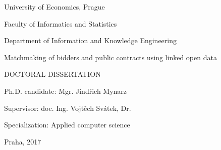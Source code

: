 \begin{titlepage}
    \begin{center}
        \begingroup 
        \sffamily

        \large
        University of Economics, Prague
        
        \small
        Faculty of Informatics and Statistics
        
        Department of Information and Knowledge Engineering

        \vfill

        \LARGE
        Matchmaking of bidders and public contracts using linked open data
        
        \normalsize
        \uppercase{Doctoral dissertation}

        \vspace{4cm}
       
        \small
        Ph.D. candidate: Mgr. Jindřich Mynarz

        Supervisor: doc. Ing. Vojtěch Svátek, Dr.

        Specialization: Applied computer science

        \vfill
        
        Praha, 2017

        \endgroup
    \end{center}
\end{titlepage}
